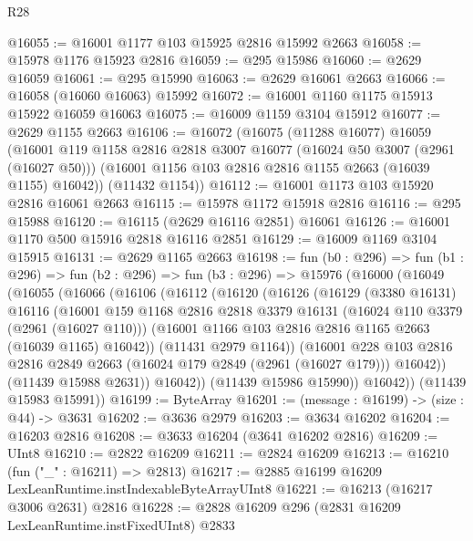 \begin{lexlean}{R28}
\begin{coremodule}
@16055 := @16001 @1177 @103 @15925 @2816 @15992 @2663
@16058 := @15978 @1176 @15923 @2816
@16059 := @295 @15986
@16060 := @2629 @16059
@16061 := @295 @15990
@16063 := @2629 @16061 @2663
@16066 := @16058 (@16060 @16063) @15992
@16072 := @16001 @1160 @1175 @15913 @15922 @16059 @16063
@16075 := @16009 @1159 @3104 @15912
@16077 := @2629 @1155 @2663
@16106 := @16072
    (@16075
      (@11288 @16077)
      @16059
      (@16001
        @119
        @1158
        @2816
        @2818
        @3007
        @16077
        (@16024 @50 @3007 (@2961 (@16027 @50)))
        (@16001 @1156 @103 @2816 @2816 @1155 @2663 (@16039 @1155) @16042))
      (@11432 @1154))
@16112 := @16001 @1173 @103 @15920 @2816 @16061 @2663
@16115 := @15978 @1172 @15918 @2816
@16116 := @295 @15988
@16120 := @16115 (@2629 @16116 @2851) @16061
@16126 := @16001 @1170 @500 @15916 @2818 @16116 @2851
@16129 := @16009 @1169 @3104 @15915
@16131 := @2629 @1165 @2663
@16198 := fun (b0 : @296) =>
  fun (b1 : @296) =>
  fun (b2 : @296) =>
  fun (b3 : @296) =>
  @15976
    (@16000
      (@16049
        (@16055
          (@16066
            (@16106
              (@16112
                (@16120
                  (@16126
                    (@16129
                      (@3380 @16131)
                      @16116
                      (@16001
                        @159
                        @1168
                        @2816
                        @2818
                        @3379
                        @16131
                        (@16024 @110 @3379 (@2961 (@16027 @110)))
                        (@16001 @1166 @103 @2816 @2816 @1165 @2663 (@16039 @1165) @16042))
                      (@11431 @2979 @1164))
                    (@16001
                      @228
                      @103
                      @2816
                      @2816
                      @2849
                      @2663
                      (@16024 @179 @2849 (@2961 (@16027 @179)))
                      @16042))
                  (@11439 @15988 @2631))
                @16042))
            (@11439 @15986 @15990))
          @16042))
      (@11439 @15983 @15991))
@16199 := ByteArray
@16201 := (message : @16199) -> (size : @44) -> @3631
@16202 := @3636 @2979
@16203 := @3634 @16202
@16204 := @16203 @2816
@16208 := @3633 @16204 (@3641 @16202 @2816)
@16209 := UInt8
@16210 := @2822 @16209
@16211 := @2824 @16209
@16213 := @16210 (fun ("_" : @16211) => @2813)
@16217 := @2885 @16199 @16209 LexLeanRuntime.instIndexableByteArrayUInt8
@16221 := @16213 (@16217 @3006 @2631) @2816
@16228 := @2828 @16209 @296 (@2831 @16209 LexLeanRuntime.instFixedUInt8) @2833

\end{coremodule}
\end{lexlean}

